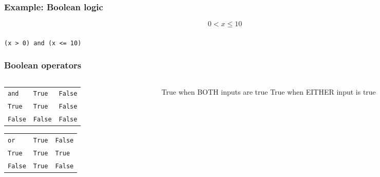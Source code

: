 \documentclass[11pt]{beamer}
\begin{document}
\begin{frame}[fragile]
  \frametitle{Example:  Boolean logic}
  \Enlarge

  \begin{center}
  $$
  0 < x \leq 10
  $$
  \\
  \texttt{(x > 0) and (x <= 10)}
  \end{center}
\end{frame}

\begin{frame}[fragile]
  \frametitle{Boolean operators}
  \Enlarge

  \begin{columns}
  \begin{column}{0.6\textwidth}
  \begin{tabular}{lll}
  \texttt{and}   & \texttt{True}  & \texttt{False} \\
  \texttt{True}  & \texttt{True}  & \texttt{False} \\
  \texttt{False} & \texttt{False} & \texttt{False} \\
  \end{tabular}
  \newline \newline \newline
  \textcolor{CS101GradBot}{
  \begin{tabular}{lll}
  \texttt{or}    & \texttt{True}  & \texttt{False} \\
  \texttt{True}  & \texttt{True}  & \texttt{True}  \\
  \texttt{False} & \texttt{True}  & \texttt{False} \\
  \end{tabular}
  }
  \end{column}
  \begin{column}{0.4\textwidth}
    True when BOTH inputs are true
    \newline \newline \newline
    \textcolor{CS101GradBot}{
    True when EITHER input is true
    }
  \end{column}
  \end{columns}
\end{frame}
\end{document}
